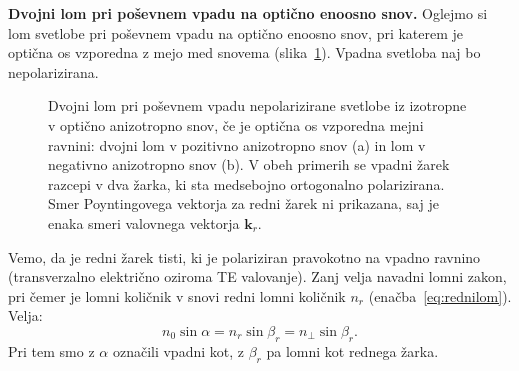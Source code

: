 \begin{example}{\bf Dvojni lom pri poševnem vpadu na optično enoosno snov.}
Oglejmo si lom svetlobe pri poševnem vpadu na optično enoosno snov, pri katerem 
je optična os vzporedna z mejo med snovema (slika~\ref{fig:10_dvolom_6}). Vpadna
svetloba naj bo nepolarizirana.
\begin{figure}[ht]
\centering
\def\svgwidth{140truemm} 

\caption{Dvojni lom pri poševnem vpadu nepolarizirane svetlobe iz izotropne v 
optično anizotropno snov, če je optična os vzporedna mejni ravnini: 
dvojni lom v pozitivno anizotropno snov (a) in lom v negativno 
anizotropno snov (b). V obeh primerih 
se vpadni žarek razcepi v dva žarka, ki sta medsebojno ortogonalno polarizirana. Smer 
Poyntingovega vektorja za redni žarek ni prikazana, saj je enaka smeri valovnega vektorja
$\mathbf{k}_r$.}
\label{fig:10_dvolom_6}
\end{figure}

Vemo, da je redni žarek tisti, ki je polariziran pravokotno na 
vpadno ravnino (transverzalno električno oziroma TE valovanje). 
Zanj velja navadni lomni zakon, pri čemer je lomni količnik v snovi 
redni lomni količnik $n_r$ (enačba~\ref{eq:rednilom}). Velja:
\begin{equation}
n_0 \sin\alpha = n_r \sin \beta_r = n_\perp\sin\beta_r.
\label{eq:10_110}
\end{equation}
Pri tem smo z $\alpha$ označili vpadni kot, z $\beta_r$ pa lomni kot rednega žarka.


\end{example}
